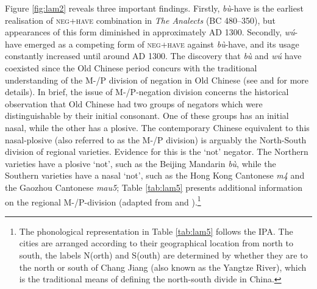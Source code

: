 \documentclass[output=paper]{langscibook}
\begin{document}
Figure \ref{fig:lam2} reveals three important findings. Firstly, \textit{bù}-have is the earliest realisation of \textsc{neg}+\textsc{have} combination in \emph{The Analects} (BC 480–350), but appearances of this form diminished in approximately AD 1300. Secondly, \textit{wú}-have emerged as a competing form of \textsc{neg}+\textsc{have} against \textit{bù}-have, and its usage constantly increased until around AD 1300. The discovery that \textit{bù} and \textit{wú} have coexisted since the Old Chinese period concurs with the traditional understanding of the M-/P division of negation in Old Chinese (see \citealt{Hashimoto1985} and \citealt{Zhang2002} for more details). In brief, the issue of M-/P-negation division concerns the historical observation that Old Chinese had two groups of negators which were distinguishable by their initial consonant. One of these groups has an initial nasal, while the other has a plosive. The contemporary Chinese equivalent to this nasal-plosive (also referred to as the M-/P division) is arguably the North-South division of regional varieties. Evidence for this is the `not' negator. The Northern varieties have a plosive `not', such as the Beijing Mandarin \textit{bù}, while the Southern varieties have a nasal `not', such as the Hong Kong Cantonese \textit{m4} and the Gaozhou Cantonese \textit{mau5}; Table \ref{tab:lam5} presents additional information on the regional M-/P-division (adapted from \citealt{Hashimoto1985} and \citealt{Zhang2002}).\footnote{The phonological representation in Table \ref{tab:lam5} follows the IPA. The cities are arranged according to their geographical location from north to south, the labels N(orth) and S(outh) are determined by whether they are to the north or south of Chang Jiang (also known as the Yangtze River), which is the traditional means of defining the north-south divide in China.} 
\end{document}
